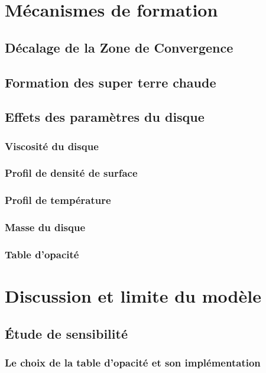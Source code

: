 \documentclass[logos,parttoc]{bordeaux-thesis}
\begin{document}
\chapter{Mécanismes de formation}
\section{Décalage de la Zone de Convergence}
\section{Formation des super terre chaude}
\section{Effets des paramètres du disque}
\subsection{Viscosité du disque}
\subsection{Profil de densité de surface}
\subsection{Profil de température}
\subsection{Masse du disque}
\subsection{Table d'opacité}

\chapter{Discussion et limite du modèle}\label{sec:discussion}
\section{Étude de sensibilité}
\subsection{Le choix de la table d'opacité et son implémentation}
\end{document}
